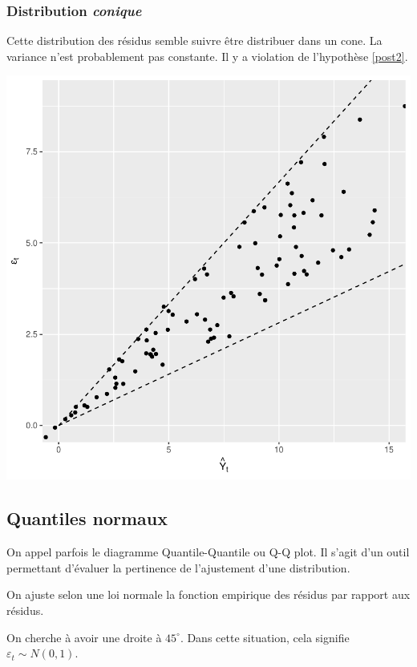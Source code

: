\documentclass[11pt,french]{report}
\begin{document}
\subsubsection{Distribution \emph{conique}}
Cette distribution des résidus semble suivre être distribuer dans un cone. La variance n'est probablement pas constante. Il y a violation de l'hypothèse \ref{post2}. 

\bigskip
\includegraphics{notes_de_cours-034}

\subsection{Quantiles normaux}
On appel parfois le diagramme Quantile-Quantile ou Q-Q plot. Il s'agit d'un outil permettant d'évaluer la pertinence de l'ajustement d'une distribution. \newline

On ajuste selon une loi normale la fonction empirique des résidus par rapport aux résidus. \newline

On cherche à avoir une droite à $45^\circ$. Dans cette situation, cela signifie $\varepsilon_t \sim N(0,1)$.
\end{document}
